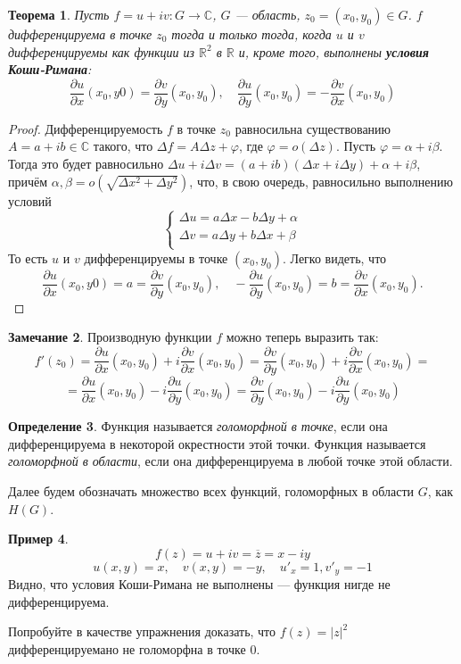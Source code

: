 \documentclass[11pt,openany,a4paper]{scrartcl}
\theoremstyle{plain}
\newtheorem{theorem}{Теорема}[section]
\theoremstyle{definition}
\newtheorem{definition}[theorem]{Определение}
\newtheorem{remark}[theorem]{Замечание}
\newtheorem{example}[theorem]{Пример}
\newcommand\mb{\mathbb}
\newcommand\real{\mb R}
\newcommand{\complex}{\mb C}
\newcommand{\pd}[2]{\frac{\partial #1}{\partial #2}}
\begin{document}
\begin{theorem}
	Пусть $f = u + iv: G  \to \complex$, $G$ — область, $z_0 = (x_0, y_0) \in G$. $f$ дифференцируема в точке
	$z_0$ тогда и только тогда, когда $u$ и $v$ дифференцируемы как функции из $\real^2$ в $\real$ и, кроме того, 
	выполнены \textbf{условия Коши-Римана}:
	$$
	\frac{\partial u}{\partial x} (x_0, y0) = \frac{\partial v}{\partial y} (x_0, y_0),\quad
	\frac{\partial u}{\partial y}(x_0, y_0) = -\frac{\partial v}{\partial x} (x_0, y_0)
	$$
\end{theorem}
\begin{proof}
	Дифференцируемость $f$ в точке $z_0$ равносильна существованию\\$A = a + ib \in \complex$ такого, что
	$\Delta f = A\Delta z + \varphi$, где $\varphi = o(\Delta z)$. Пусть $\varphi = \alpha + i\beta$. Тогда это 
	будет равносильно $\Delta u + i\Delta v = (a + ib)(\Delta x + i\Delta y) + \alpha + i\beta$, причём $\alpha, 
	\beta = o(\sqrt{\Delta x^2 + \Delta y^2})$, что, в свою очередь, равносильно выполнению условий
	$$
	\begin{cases}
		\Delta u = a\Delta x - b\Delta y + \alpha\\
		\Delta v = a\Delta y + b\Delta x + \beta\\
	\end{cases}
	$$
	То есть $u$ и $v$ дифференцируемы в точке $(x_0, y_0)$. Легко видеть, что
	$$
	\frac{\partial u}{\partial x} (x_0, y0) = a = \frac{\partial v}{\partial y} (x_0, y_0), \quad
	-\frac{\partial u}{\partial y} (x_0, y_0) = b = \frac{\partial v}{\partial x}(x_0, y_0).
	$$
\end{proof}
\begin{remark}
	Производную функции $f$ можно теперь выразить так: $$
	f'(z_0) = \pd{u}{x}(x_0, y_0) + i\pd{v}{x}(x_0, y_0) = \pd{v}{y}(x_0, y_0) + i\pd{v}{x}(x_0, y_0) =
	$$
	$$
	= \pd{u}{x}(x_0, y_0) - i\pd{u}{y}(x_0, y_0) = \pd{v}{y}(x_0, y_0) - i\pd{u}{y}(x_0, y_0) 
	$$
\end{remark}
\begin{definition}
	Функция называется \emph{голоморфной в точке}, если она дифференцируема в некоторой окрестности этой точки. 
	Функция называется \emph{голоморфной в области}, если она дифференцируема в любой точке этой области.
\end{definition}
Далее будем обозначать множество всех функций, голоморфных в области $G$, как $H(G)$.

\begin{example}
	$$
	f(z) = u + iv = \overline z = x - iy
	$$
	$$
	u(x, y) = x,\quad v(x, y) = -y,\quad u'_x = 1, v'_y = -1
	$$
	Видно, что условия Коши-Римана не выполнены — функция нигде не дифференцируема.
\end{example}
Попробуйте в качестве упражнения доказать, что $f(z) = |z|^2$ дифференцируемано не голоморфна в точке $0$.
\end{document}
